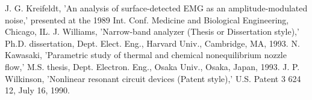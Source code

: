 \documentclass[letterpaper, 10 pt, conference]{ieeeconf}  %
\begin{document}
\begin{thebibliography}{99}
 J. G. Kreifeldt, 'An analysis of surface-detected EMG as an amplitude-modulated noise,' presented at the 1989 Int. Conf. Medicine and Biological Engineering, Chicago, IL.
 J. Williams, 'Narrow-band analyzer (Thesis or Dissertation style),' Ph.D. dissertation, Dept. Elect. Eng., Harvard Univ., Cambridge, MA, 1993. 
 N. Kawasaki, 'Parametric study of thermal and chemical nonequilibrium nozzle flow,' M.S. thesis, Dept. Electron. Eng., Osaka Univ., Osaka, Japan, 1993.
 J. P. Wilkinson, 'Nonlinear resonant circuit devices (Patent style),' U.S. Patent 3 624 12, July 16, 1990. 

\end{thebibliography}
\end{document}
